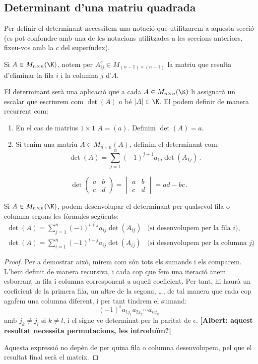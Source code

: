 \subsection{Determinant d'una matriu quadrada}
 Per definir el determinant necessitem una notació que utilitzarem a aquesta secció (es pot confondre amb una de les notacions utilitzades a les seccions anteriors, fixeu-vos amb la $c$ del superíndex).
\begin{notacio}
	Si $A\in M_{n\times n}(\K)$, notem per $A^c_{ij}\in M_{(n-1)\times(n-1)}$ la matriu que resulta d'eliminar la fila $i$ i la columna $j$ d'$A$. 
\end{notacio}
El determinant serà una aplicació que a cada $A\in M_{n\times n}(\K)$ li assignarà un escalar que escriurem com $\det(A)$ o bé $|A|\in \K$. El podem definir de manera recurrent com:
\begin{enumerate}
	\item En el cas de matrius $1\times 1$ $A=(a)$. Definim $\det(A)=a$.
	\item Si tenim una matriu $A \in M_{n\times n}(A)$, definim el determinant com:
	$$
	\det(A)=\sum_{j=1}^n (-1)^{j+1} a_{1j} \det(A_{1j}) \,.
	$$
\end{enumerate} 
\begin{exemple}
	$$
	\det\begin{pmatrix}
	a & b \\ c & d
	\end{pmatrix} =
	\begin{vmatrix}
	a & b \\ c & d
	\end{vmatrix}=ad-bc \,.
	$$
\end{exemple}
\begin{proposicio}\label{prop:defdet}
	Si $A\in M_{n\times n}(\K)$, podem desenvolupar el determinant per qualsevol fila o columna segons les fórmules següents:
	$$
	\begin{array}{ll}
	\det(A)=\sum_{j=1}^n (-1)^{i+j} a_{ij} \det(A_{ij}) & \text{(si desenvolupem per la fila $i$)},\\[3mm]
	\det(A)=\sum_{i=1}^n (-1)^{i+j} a_{ij} \det(A_{ij}) & \text{(si desenvolupem per la columna $j$)}.
	\end{array}
	$$
\end{proposicio}
\begin{proof}
	Per a demostrar això, mirem com són tots els sumands i els comparem. L'hem definit de manera recursiva, i cada cop que fem una iteració anem esborrant la fila i columna corresponent a aquell coeficient. Per tant, hi haurà un coeficient de la primera fila, un altre de la segona, \ldots, de tal manera que cada cop agafem una columna diferent, i per tant tindrem el sumand:
	\begin{equation}\label{eq:sumanddet}
	(-1)^\epsilon a_{1j_1} a_{2j_2} \cdots a_{nj_n}
	\end{equation}
	amb $j_k\neq j_l$ si $k\neq l$, i el signe ve determinat per la paritat de $\epsilon$. \textbf{[Albert: aquest resultat necessita permutacions, les introduïm?]}
	
	Aquesta expressió no depèn de per quina fila o columna desenvolupem, pel que el resultat final serà el mateix.
\end{proof}

